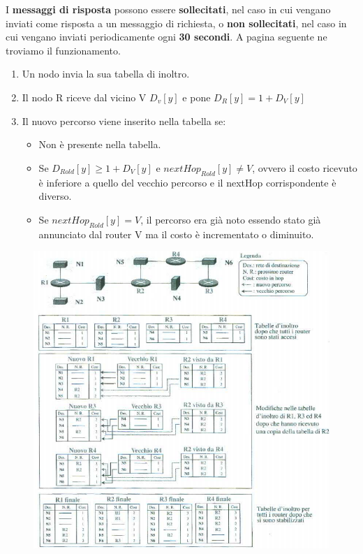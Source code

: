 \documentclass[11pt,a4paper,oneside]{book}
\theoremstyle{definition}
\begin{document}
I \textbf{messaggi di risposta} possono essere \textbf{sollecitati}, nel caso in cui vengano inviati come risposta a un messaggio di richiesta, o \textbf{non sollecitati}, nel caso in cui vengano inviati periodicamente ogni \textbf{30 secondi}.
A pagina seguente ne troviamo il funzionamento.

\pagebreak

\begin{enumerate}
	\item Un nodo invia la sua tabella di inoltro.
	\item Il nodo R riceve dal vicino V $D_{v}[y]$ e pone
	      $D_{R}[y] = 1 + D_{V}[y]$
	\item Il nuovo percorso viene inserito nella tabella se:
	      \begin{itemize}
		      \item Non è presente nella tabella.
		      \item Se $D_{Rold}[y] \geq 1 + D_{V}[y]$ e $nextHop_{Rold}[y] \neq V$, ovvero il costo ricevuto è inferiore a quello del vecchio percorso e il nextHop corrispondente è diverso.
		      \item Se $nextHop_{Rold}[y] = V$, il percorso era già noto essendo stato già
		            annunciato dal router V ma il costo è incrementato o diminuito.
	      \end{itemize}
\end{enumerate}
\begin{figure}[!h]
	\centering
	\includegraphics[scale=0.6]{Immagini/RIP_ex.png}
\end{figure}
\end{document}
